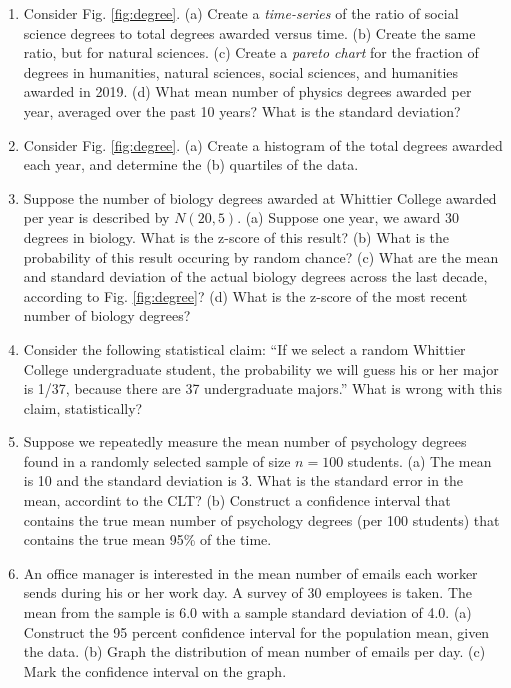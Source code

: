 \documentclass{article}
\begin{document}
\begin{enumerate}
\item Consider Fig. \ref{fig:degree}.  (a) Create a \textit{time-series} of the ratio of social science degrees to total degrees awarded versus time. (b) Create the same ratio, but for natural sciences. (c) Create a \textit{pareto chart} for the fraction of degrees in humanities, natural sciences, social sciences, and humanities awarded in 2019. (d) What mean number of physics degrees awarded per year, averaged over the past 10 years?  What is the standard deviation? \\ \vspace{4cm}
\item Consider Fig. \ref{fig:degree}.  (a) Create a histogram of the total degrees awarded each year, and determine the (b) quartiles of the data. \\ \vspace{3cm}
\item Suppose the number of biology degrees awarded at Whittier College awarded per year is described by $N(20,5)$.  (a) Suppose one year, we award 30 degrees in biology.  What is the z-score of this result?  (b) What is the probability of this result occuring by random chance? (c) What are the mean and standard deviation of the actual biology degrees across the last decade, according to Fig. \ref{fig:degree}? (d) What is the z-score of the most recent number of biology degrees? \\ \vspace{3cm}
\item Consider the following statistical claim: ``If we select a random Whittier College undergraduate student, the probability we will guess his or her major is 1/37, because there are 37 undergraduate majors.''  What is wrong with this claim, statistically? \\ \vspace{2cm}
\item Suppose we repeatedly measure the mean number of psychology degrees found in a randomly selected sample of size $n=100$ students.  (a) The mean is 10 and the standard deviation is 3.  What is the standard error in the mean, accordint to the CLT? (b) Construct a confidence interval that contains the true mean number of psychology degrees (per 100 students) that contains the true mean 95\% of the time.  \\ \vspace{2cm}
\item An office manager is interested in the mean number of emails each worker sends during his or her work day.  A survey of 30 employees is taken. The mean from the sample is 6.0 with a sample standard deviation of 4.0. (a) Construct the 95 percent confidence interval for the population mean, given the data.  (b) Graph the distribution of mean number of emails per day.  (c) Mark the confidence interval on the graph. \\ \vspace{2cm}

\end{enumerate}
\end{document}
